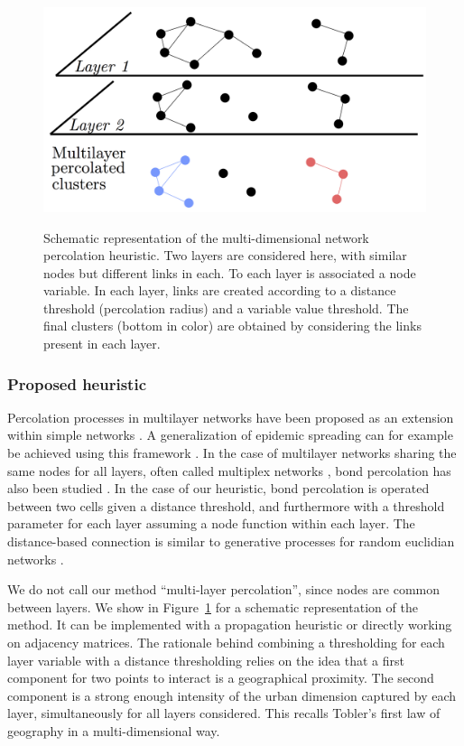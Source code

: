 \documentclass{jimis-en}
\begin{document}
\begin{figure}[!ht] 
  {\includegraphics[width=0.75\linewidth]{Fig1.png}}
  \centering
  \caption{Schematic representation of the multi-dimensional network percolation heuristic. Two layers are considered here, with similar nodes but different links in each. To each layer is associated a node variable. In each layer, links are created according to a distance threshold (percolation radius) and a variable value threshold. The final clusters (bottom in color) are obtained by considering the links present in each layer.\label{fig:method}}
\end{figure}


\subsubsection{Proposed heuristic}

Percolation processes in multilayer networks have been proposed as an extension within simple networks \citep{boccaletti2014structure}. A generalization of epidemic spreading can for example be achieved using this framework \citep{son2012percolation}. In the case of multilayer networks sharing the same nodes for all layers, often called multiplex networks \citep{aleta2018multilayer}, bond percolation has also been studied \citep{hackett2016bond}. In the case of our heuristic, bond percolation is operated between two cells given a distance threshold, and furthermore with a threshold parameter for each layer assuming a node function within each layer. The distance-based connection is similar to generative processes for random euclidian networks \citep{penrose1999k}.

We do not call our method ``multi-layer percolation'', since nodes are common between layers. We show in Figure~\ref{fig:method} for a schematic representation of the method. It can be implemented with a propagation heuristic or directly working on adjacency matrices. The rationale behind combining a thresholding for each layer variable with a distance thresholding relies on the idea that a first component for two points to interact is a geographical proximity. The second component is a strong enough intensity of the urban dimension captured by each layer, simultaneously for all layers considered. This recalls Tobler's first law of geography \citep{tobler2004first} in a multi-dimensional way.
\end{document}
